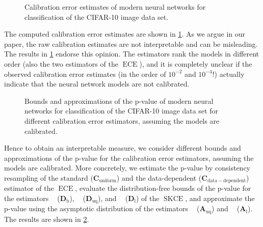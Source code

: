 \documentclass{article}
\DeclareMathOperator{\ECE}{ECE}
\DeclareMathOperator{\squaredkernelmeasure}{SKCE}
\DeclareMathOperator{\biasedestimator}{\widehat{SKCE}_b}
\DeclareMathOperator{\unbiasedestimator}{\widehat{SKCE}_{uq}}
\DeclareMathOperator{\linearestimator}{\widehat{SKCE}_{ul}}
\begin{document}
\begin{figure}[!htbp]
  \begin{center}
    
    \caption{Calibration error estimates of modern neural networks for
      classification of the CIFAR-10 image data set.}
    \label{fig:cifar10_errors}
  \end{center}
\end{figure}

The computed calibration error estimates are shown in \cref{fig:cifar10_errors}.
As we argue in our paper, the raw calibration estimates are not interpretable
and can be misleading. The results in \cref{fig:cifar10_errors} endorse this
opinion. The estimators rank the models in different order (also the two
estimators of the $\ECE$), and it is completely unclear if the observed
calibration error estimates (in the order of $10^{-2}$ and $10^{-4}$!) actually
indicate that the neural network models are not calibrated.

\begin{figure}[!htbp]
  \begin{center}
    
    \caption{Bounds and approximations of the p-value of modern neural networks
      for classification of the CIFAR-10 image data set for different calibration
      error estimators, assuming the models are calibrated.}
    \label{fig:cifar10_pvalues}
  \end{center}
\end{figure}

Hence to obtain an interpretable measure, we consider different bounds and
approximations of the p-value for the calibration error estimators, assuming the
models are calibrated. More concretely, we estimate the p-value by consistency
resampling of the standard ($\mathbf{C}_{\mathrm{uniform}}$) and the data-dependent
($\mathbf{C}_{\mathrm{data-dependent}}$) estimator of the $\ECE$, evaluate the
distribution-free bounds of the p-value for the estimators $\biasedestimator$
($\mathbf{D}_{\mathrm{b}}$), $\unbiasedestimator$ ($\mathbf{D}_{\mathrm{uq}}$), and
$\linearestimator$ ($\mathbf{D}_{\mathrm{l}}$) of the $\squaredkernelmeasure$,
and approximate the p-value using the asymptotic distribution of the estimators
$\unbiasedestimator$ ($\mathbf{A}_{\mathrm{uq}}$) and $\linearestimator$
($\mathbf{A}_{\mathrm{l}}$). The results are shown in \cref{fig:cifar10_pvalues}.
\end{document}
